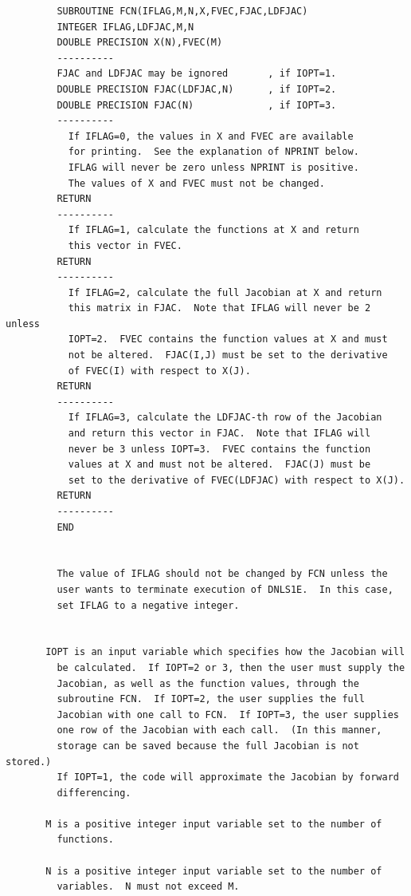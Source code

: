 \documentclass[11pt,twoside]{article}
\begin{document}
\begin{verbatim}
         SUBROUTINE FCN(IFLAG,M,N,X,FVEC,FJAC,LDFJAC)
         INTEGER IFLAG,LDFJAC,M,N
         DOUBLE PRECISION X(N),FVEC(M)
         ----------
         FJAC and LDFJAC may be ignored       , if IOPT=1.
         DOUBLE PRECISION FJAC(LDFJAC,N)      , if IOPT=2.
         DOUBLE PRECISION FJAC(N)             , if IOPT=3.
         ----------
           If IFLAG=0, the values in X and FVEC are available
           for printing.  See the explanation of NPRINT below.
           IFLAG will never be zero unless NPRINT is positive.
           The values of X and FVEC must not be changed.
         RETURN
         ----------
           If IFLAG=1, calculate the functions at X and return
           this vector in FVEC.
         RETURN
         ----------
           If IFLAG=2, calculate the full Jacobian at X and return
           this matrix in FJAC.  Note that IFLAG will never be 2 unless
           IOPT=2.  FVEC contains the function values at X and must
           not be altered.  FJAC(I,J) must be set to the derivative
           of FVEC(I) with respect to X(J).
         RETURN
         ----------
           If IFLAG=3, calculate the LDFJAC-th row of the Jacobian
           and return this vector in FJAC.  Note that IFLAG will
           never be 3 unless IOPT=3.  FVEC contains the function
           values at X and must not be altered.  FJAC(J) must be
           set to the derivative of FVEC(LDFJAC) with respect to X(J).
         RETURN
         ----------
         END


         The value of IFLAG should not be changed by FCN unless the
         user wants to terminate execution of DNLS1E.  In this case,
         set IFLAG to a negative integer.


       IOPT is an input variable which specifies how the Jacobian will
         be calculated.  If IOPT=2 or 3, then the user must supply the
         Jacobian, as well as the function values, through the
         subroutine FCN.  If IOPT=2, the user supplies the full
         Jacobian with one call to FCN.  If IOPT=3, the user supplies
         one row of the Jacobian with each call.  (In this manner,
         storage can be saved because the full Jacobian is not stored.)
         If IOPT=1, the code will approximate the Jacobian by forward
         differencing.

       M is a positive integer input variable set to the number of
         functions.

       N is a positive integer input variable set to the number of
         variables.  N must not exceed M.


\end{verbatim}
\end{document}
